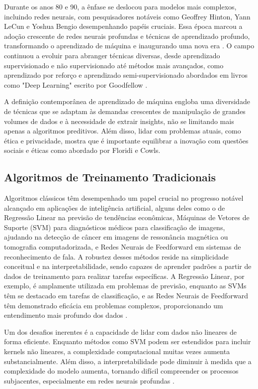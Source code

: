 Durante os anos 80 e 90, a ênfase se deslocou para modelos mais complexos, incluindo redes neurais, com pesquisadores notáveis como Geoffrey Hinton, Yann LeCun e Yoshua Bengio desempenhando papéis cruciais. Essa época marcou a adoção crescente de redes neurais profundas e técnicas de aprendizado profundo, transformando o aprendizado de máquina e inaugurando uma nova era \cite{hinton2012deep}. O campo continuou a evoluir para abranger técnicas diversas, desde aprendizado supervisionado e não supervisionado até métodos mais avançados, como aprendizado por reforço e aprendizado semi-supervisionado abordados em livros como "Deep Learning" escrito por Goodfellow \cite{goodfellow2016deep}.

A definição contemporânea de aprendizado de máquina engloba uma diversidade de técnicas que se adaptam às demandas crescentes de manipulação de grandes volumes de dados e à necessidade de extrair insights, não se limitando mais apenas a algoritmos preditivos. Além disso, lidar com problemas atuais, como ética e privacidade, mostra que é importante equilibrar a inovação com questões sociais e éticas como abordado por Floridi e Cowls\cite{floridi2018ai}.

\subsection{Algoritmos de Treinamento Tradicionais}

Algoritmos clássicos têm desempenhado um papel crucial no progresso notável alcançado em aplicações de inteligência artificial, alguns deles como o de Regressão Linear na previsão de tendências econômicas, Máquinas de Vetores de Suporte (SVM) para diagnósticos médicos para classificação de imagens, ajudando na detecção de câncer em imagens de ressonância magnética ou tomografia computadorizada, e Redes Neurais de Feedforward em sistemas de reconhecimento de fala. A robustez desses métodos reside na simplicidade conceitual e na interpretabilidade, sendo capazes de aprender padrões a partir de dados de treinamento para realizar tarefas específicas. A Regressão Linear, por exemplo, é amplamente utilizada em problemas de previsão, enquanto as SVMs têm se destacado em tarefas de classificação, e as Redes Neurais de Feedforward têm demonstrado eficácia em problemas complexos, proporcionando um entendimento mais profundo dos dados \cite{bishop2006pattern} \cite{russell2016artificial}.

Um dos desafios inerentes é a capacidade de lidar com dados não lineares de forma eficiente. Enquanto métodos como SVM podem ser estendidos para incluir kernels não lineares, a complexidade computacional muitas vezes aumenta substancialmente. Além disso, a interpretabilidade pode diminuir à medida que a complexidade do modelo aumenta, tornando difícil compreender os processos subjacentes, especialmente em redes neurais profundas \cite{goh2017deep}.

